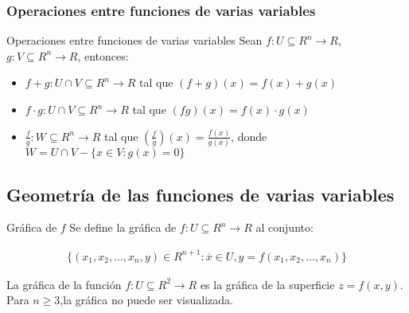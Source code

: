 \documentclass[a4paper, twoside]{article}
\numberwithin{equation}{section}
\numberwithin{figure}{section}
\numberwithin{table}{section}
\begin{document}
\subsubsection{Operaciones entre funciones de varias variables}
\begin{definicion*}{Operaciones entre funciones de varias variables}
	Sean $f:U\subseteq R^n \to R$, $g:V\subseteq R^n \to R$, entonces:
	\begin{itemize}
		\item $f + g: U \cap V \subseteq R^n \rightarrow R$ tal que $\left( f + g \right) \left( x \right) = f \left( x \right) + g \left( x \right)$
		\item $f \cdot g: U \cap V \subseteq R^n \rightarrow R$ tal que $\left( fg \right) \left( x \right) = f \left( x \right) \cdot g \left( x \right)$
		\item $\frac{f}{g}: W \subseteq R^n \rightarrow R$ tal que $\left( \frac{f}{g} \right) \left( x \right) = \frac{f \left( x \right)}{g \left( x \right)}$, donde $W = U \cap V - \{x \in V: g \left(x\right) = 0\}$
	\end{itemize}
\end{definicion*}

\subsection{Geometría de las funciones de varias variables}
\begin{definicion*}{Gráfica de $f$}
	Se define la gráfica de $f:U\subseteq R^n \rightarrow R$ al conjunto:
	
	\begin{align}
		\{(x_1,x_2,\ldots,x_n,y)\in R^{n+1}:\overline{x}\in U,y=f(x_1,x_2,\ldots,x_n)\}
	\end{align}
	
	La gráfica de la función $f:U\subseteq R^2 \rightarrow R$ es la gráfica de la superficie $z=f\left(x,y\right)$.\\
	
	Para $n\geq3$,la gráfica no puede ser visualizada. \\
\end{definicion*}
\end{document}
